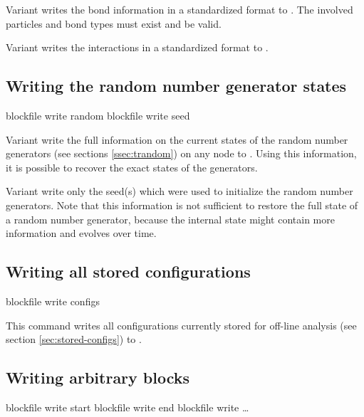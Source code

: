 Variant  writes the bond information in a standardized
format to . The involved particles and bond types must
exist and be valid.

Variant  writes the interactions in a standardized format
to .

\subsection{Writing the random number generator states}
\begin{essyntax}
   blockfile  write random
   blockfile  write seed
\end{essyntax}

Variant  write the full information on the
current states of the random number generators (see
sections \vref{ssec:trandom}) on any node to
.  Using this information, it is possible to recover the
exact states of the generators.

Variant  write only the seed(s) which were
used to initialize the random number generators. Note that this
information is not sufficient to restore the full state of a random
number generator, because the internal state might contain more
information and evolves over time.

\subsection{Writing all stored configurations}
\label{sec:blockfile:configs}
\begin{essyntax}
  blockfile  write configs
\end{essyntax}

This command writes all configurations currently stored for off-line
analysis (see section \vref{sec:stored-configs}) to .

\subsection{Writing arbitrary blocks}

\begin{essyntax}
   blockfile  write start 
   blockfile  write end
   blockfile  write  \dots
\end{essyntax}

